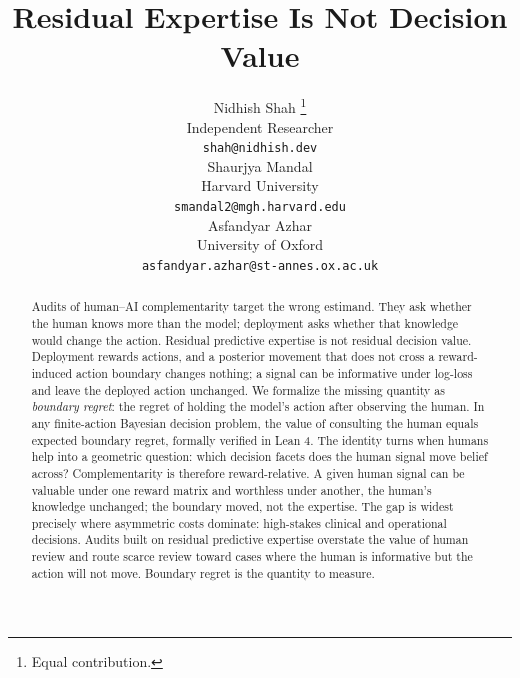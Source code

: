 \documentclass{article}
\title{Residual Expertise Is Not Decision Value}
\author{
    Nidhish Shah \thanks{Equal contribution.} \\
    Independent Researcher \\
    \texttt{shah@nidhish.dev} \\
\And
    Shaurjya Mandal \footnotemark[1] \\
    Harvard University \\
    \texttt{smandal2@mgh.harvard.edu} \\
\And
    Asfandyar Azhar \\
    University of Oxford \\
    \texttt{asfandyar.azhar@st-annes.ox.ac.uk} \\
}
\begin{document}
\maketitle

\begin{abstract}
Audits of human--AI complementarity target the wrong estimand.
They ask whether the human knows more than the model; deployment asks whether that knowledge would change the action.
Residual predictive expertise is not residual decision value.
Deployment rewards actions, and a posterior movement that does not cross a reward-induced action boundary changes nothing; a signal can be informative under log-loss and leave the deployed action unchanged.
We formalize the missing quantity as \emph{boundary regret}: the regret of holding the model's action after observing the human.
In any finite-action Bayesian decision problem, the value of consulting the human equals expected boundary regret, formally verified in Lean 4.
The identity turns when humans help into a geometric question: which decision facets does the human signal move belief across?
Complementarity is therefore reward-relative.
A given human signal can be valuable under one reward matrix and worthless under another, the human's knowledge unchanged; the boundary moved, not the expertise.
The gap is widest precisely where asymmetric costs dominate: high-stakes clinical and operational decisions.
Audits built on residual predictive expertise overstate the value of human review and route scarce review toward cases where the human is informative but the action will not move.
Boundary regret is the quantity to measure.
\end{abstract}










\clearpage

\clearpage

\end{document}

